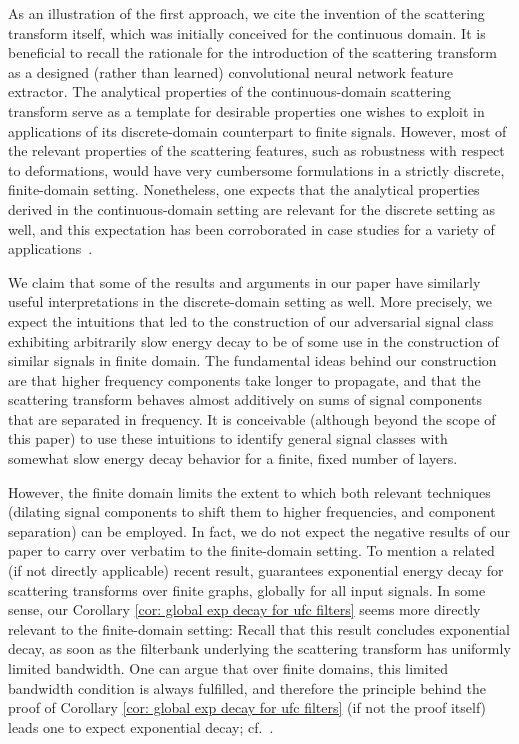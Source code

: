 \documentclass[11pt]{amsart}
\newenvironment{proof sketch} {\textit{Proof sketch.}}{}
\begin{document}
  As an illustration of the first approach, we cite the invention of the scattering transform itself, which was initially conceived for the continuous domain. It is beneficial to recall the rationale for the introduction of the scattering transform as a designed (rather than learned) convolutional neural network feature extractor. The analytical properties of the continuous-domain scattering transform serve as a template for desirable properties one wishes to exploit in applications of its discrete-domain counterpart to
  finite signals. However, most of the relevant properties of the scattering features, such as robustness with respect to deformations, would have very cumbersome formulations in a strictly discrete, finite-domain setting. Nonetheless, one expects that the analytical properties derived in the continuous-domain setting are relevant for the discrete setting as well,
  and this expectation has been corroborated in case studies for a variety of applications~\cite{anden2015joint,hirn2017quantum,bruna2013invariant}.
  
  We claim that some of the results and arguments in our paper have similarly useful interpretations in the discrete-domain setting as well. More precisely, we expect the intuitions that led to the construction of our adversarial signal class exhibiting arbitrarily slow energy decay to be of some use in the construction of similar signals in finite domain. The fundamental ideas behind our construction are that higher frequency components take longer to propagate, and that the scattering transform behaves almost additively on sums of signal components that are separated in frequency. It is conceivable (although beyond the scope of this paper) to use these intuitions to identify general signal classes with somewhat slow energy decay behavior for a finite, fixed number of layers.

  However, the finite domain limits the extent to which both relevant techniques (dilating signal components to shift them to higher frequencies, and component separation) can be employed. In fact, we do not expect the negative results of our paper to carry over verbatim to the finite-domain setting. To mention a related (if not directly applicable) recent result, \cite[Proposition 3.3]{zou2020graph} guarantees exponential energy decay for scattering transforms over finite graphs, globally for all input signals. In some sense, our Corollary \ref{cor: global exp decay for ufc filters} seems more directly relevant to the finite-domain setting: Recall that this result concludes exponential decay, as soon as the filterbank underlying the scattering transform has uniformly limited bandwidth. One can argue that over finite domains, this limited bandwidth condition is always fulfilled, and therefore the principle behind the proof of Corollary \ref{cor: global exp decay for ufc filters} (if not the proof itself) leads one to expect exponential decay; cf.~\cite{getter2025digital}.
  
\end{document}
